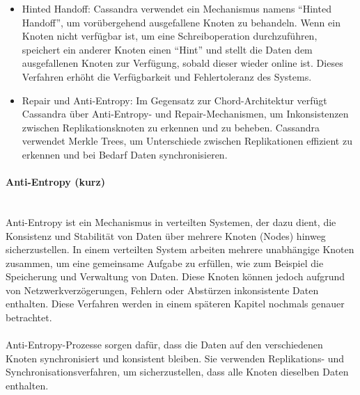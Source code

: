 \begin{itemize}
\item Hinted Handoff: Cassandra verwendet ein Mechanismus namens \enquote{Hinted Handoff}, um vorübergehend ausgefallene Knoten zu behandeln. Wenn ein Knoten nicht verfügbar ist, um eine Schreiboperation durchzuführen, speichert ein anderer Knoten einen \enquote{Hint} und stellt die Daten dem ausgefallenen Knoten zur Verfügung, sobald dieser wieder online ist. Dieses Verfahren erhöht die Verfügbarkeit und Fehlertoleranz des Systems.
\item Repair und Anti-Entropy: Im Gegensatz zur Chord-Architektur verfügt Cassandra über Anti-Entropy- und Repair-Mechanismen, um Inkonsistenzen zwischen Replikationsknoten zu erkennen und zu beheben. Cassandra verwendet Merkle Trees, um Unterschiede zwischen Replikationen effizient zu erkennen und bei Bedarf Daten synchronisieren.
\end{itemize}
\paragraph{Anti-Entropy (kurz)\\\\}
Anti-Entropy ist ein Mechanismus in verteilten Systemen, der dazu dient, die Konsistenz und Stabilität von Daten über mehrere Knoten (Nodes) hinweg sicherzustellen. In einem verteilten System arbeiten mehrere unabhängige Knoten zusammen, um eine gemeinsame Aufgabe zu erfüllen, wie zum Beispiel die Speicherung und Verwaltung von Daten. Diese Knoten können jedoch aufgrund von Netzwerkverzögerungen, Fehlern oder Abstürzen inkonsistente Daten enthalten. Diese Verfahren werden in einem späteren Kapitel nochmals genauer betrachtet. 
\\\\
Anti-Entropy-Prozesse sorgen dafür, dass die Daten auf den verschiedenen Knoten synchronisiert und konsistent bleiben. Sie verwenden Replikations- und Synchronisationsverfahren, um sicherzustellen, dass alle Knoten dieselben Daten enthalten.

\label{Woche06}
